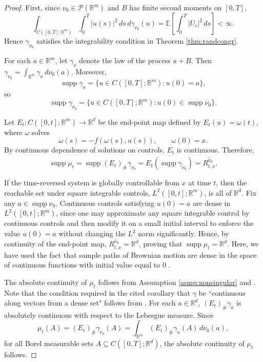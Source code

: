 \documentclass{article}
\newcommand{\R}{\mathbb{R}}
\begin{document}
\begin{proof}
First, since $\nu_0 \in \mathcal{P}(\R^m)$ and $B$ has finite second moments on $[0,T]$,
\[
\int_{C([0,T];\mathbb R^m)} \int_0^T |u(s)|^2\,ds \, d\gamma_{\nu_0}(u)
=
\mathbb E\!\left[\int_0^T |U_s|^2\,ds\right]
< \infty.
\]
Hence $\gamma_{\nu_0}$ satisfies the integrability condition in
Theorem \ref{thm:randcongr}.

For each $a\in\mathbb R^m$, let $\gamma_a$ denote the law of the process
$a+B$. Then
$
\gamma_{\nu_0} = \int_{\mathbb R^m} \gamma_a \, d\nu_0(a).$
Moreover, \[
\operatorname{supp}\gamma_a
=
\{u\in C([0,T];\mathbb R^m): u(0)=a\},\]
so
\[
\operatorname{supp}\gamma_{\nu_0}
=
\{u\in C([0,T];\mathbb R^m): u(0)\in \operatorname{supp}\nu_0\}.
\]

Let $E_t:C([0,t];\mathbb R^m)\to\mathbb R^d$ be the end-point map defined by
$E_t(u)=\omega(t)$, where $\omega$ solves
\[
\dot\omega(s)=-f(\omega(s),u(s)),\qquad \omega(0)=x.
\]
By continuous dependence of solutions on controls, $E_t$ is continuous.
Therefore,
\[
\operatorname{supp}\mu_t
=
\operatorname{supp}(E_t)_{\#}\gamma_{\nu_0}
=
\overline{E_t(\operatorname{supp}\gamma_{\nu_0})}
=
\overline{R^{\nu_0}_{t,x}}.
\]

If the time-reversed system is globally controllable from $x$ at time $t$,
then the reachable set under square integrable controls, $L^2([0,t];\mathbb R^m)$, is all of $\mathbb R^d$.
Fix any $a\in\operatorname{supp}\nu_0$. Continuous controls satisfying
$u(0)=a$ are dense in $L^2([0,t];\mathbb R^m)$, since one may approximate
any square integrable control by continuous controls and then modify it on a small
initial interval to enforce the value $u(0)=a$ without changing the
$L^2$ norm significantly. Hence, by continuity of the end-point map,
$\overline{R^{\nu_0}_{t,x}}=\mathbb R^d$, proving that
$\operatorname{supp}\mu_t=\mathbb R^d$. Here, we have used the fact that sample paths of Brownian motion are dense in the space of continuous functions with initial value equal to $0$ \citep[Page 30]{bogachev2010differentiable}.

The absolute continuity of $\mu_t$ follows from Assumption \eqref{asmp:nonsingular} and \citep[9.2.5. Corollary]{bogachev2010differentiable}. Note that the condition required in the cited corollary that $\gamma$ be ``continuous along vectors from a dense set" follows from \citep[3.1.9. Theorem]{bogachev2010differentiable}.  For each $a \in \mathbb{R}^d$, $
(E_t)_{\#}\gamma_a $ is absolutely continuous with respect to the Lebesgue measure. 
Since
\[
\mu_t(A)
=
(E_t)_{\#}\gamma_{\nu_0}(A)
=
\int_{\mathbb R^m} (E_t)_{\#}\gamma_a(A) \, d\nu_0(a),
\]
for all Borel measurable sets $A \subseteq C([0,T];\mathbb{R}^d)$, the absolute continuity of $\mu_t$  follows.
\end{proof}
\end{document}
